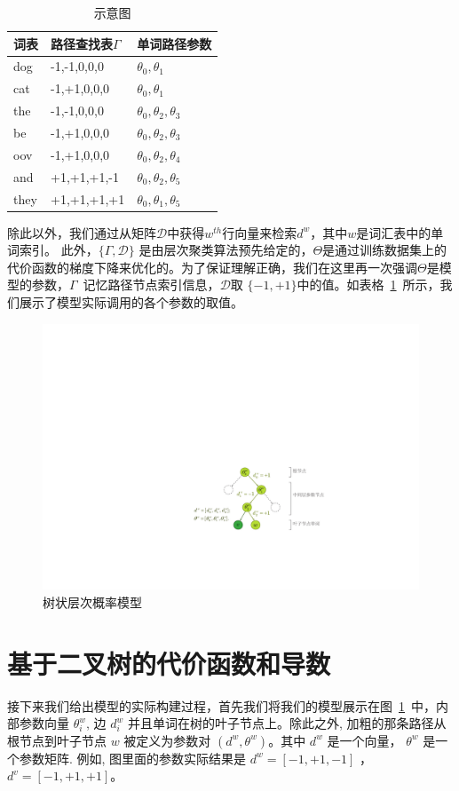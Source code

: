 \begin{table}[!ht]
  \centering
  \caption{示意图}\label{tab:example}
\begin{tabular}{lll}
  \toprule
  词表&路径查找表$\Gamma$& 单词路径参数\\ \midrule
dog & -1,-1,0,0,0& $\theta_0,\theta_1$\\
cat & -1,+1,0,0,0&$\theta_0,\theta_1$\\
the & -1,-1,0,0,0& $\theta_0,\theta_2,\theta_3$\\
be & -1,+1,0,0,0&$\theta_0,\theta_2,\theta_3$\\
oov & -1,+1,0,0,0&$\theta_0,\theta_2,\theta_4$\\
and & +1,+1,+1,-1& $\theta_0,\theta_2,\theta_5$\\
they & +1,+1,+1,+1&$\theta_0,\theta_1,\theta_5$\\
  \bottomrule
\end{tabular}
\end{table}


除此以外，我们通过从矩阵$\mathcal{D}$中获得$w^{th}$行向量来检索$d^w$，其中$w$是词汇表中的单词索引。 此外，$\{\Gamma,\mathcal{D}\}$ 是由层次聚类算法预先给定的，$\Theta$是通过训练数据集上的代价函数的梯度下降来优化的。为了保证理解正确，我们在这里再一次强调$\Theta$是模型的参数，$\Gamma$~记忆路径节点索引信息，$\mathcal {D}$取 $ \{ - 1,+1 \} $中的值。如表格~\ref{tab:example}~所示，我们展示了模型实际调用的各个参数的取值。


\begin{figure}[!h]
  \centering
    \includegraphics[width=0.8\linewidth]{./figures/thsm.pdf}
\caption{树状层次概率模型}\label{fig:tree_hsm} %
\end{figure}

\section{基于二叉树的代价函数和导数}
接下来我们给出模型的实际构建过程，首先我们将我们的模型展示在图~\ref{fig:tree_hsm}~中，内部参数向量 $\theta_i^w$, 边 $d_i^w$ 并且单词在树的叶子节点上。除此之外, 加粗的那条路径从根节点到叶子节点 $w$ 被定义为参数对 $(d^w,\theta^w)$。其中 $d^w$ 是一个向量， $\theta^w$ 是一个参数矩阵. 例如, 图里面的参数实际结果是 $d^w=[-1,+1,-1]$ ， $d^{v}=[-1,+1,+1]$。


